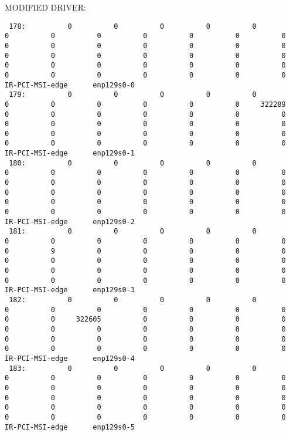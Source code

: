 MODIFIED DRIVER:
\begin{lstlisting}
 178:          0          0          0          0          0          0          0          0          0          0          0          0          0          0          0          0          0          0          0          0          0          0          0          0          0          0          0          0          0          0          0          0          0          0          0          0          0          0          0          0  IR-PCI-MSI-edge      enp129s0-0
 179:          0          0          0          0          0          0          0          0          0          0          0     322289          0          0          0          0          0          0          0          0          0          0          0          0          0          0          0          0          0          0          0          0          0          0          0          0          0          0          0          0  IR-PCI-MSI-edge      enp129s0-1
 180:          0          0          0          0          0          0          0          0          0          0          0          0          0          0          0          0          0          0          0          0          0          0          0          0          0          0          0          0          0          0          0          0          0          0          0          0          0          0          0          0  IR-PCI-MSI-edge      enp129s0-2
 181:          0          0          0          0          0          0          0          0          0          0          0          0          0          9          0          0          0          0          0          0          0          0          0          0          0          0          0          0          0          0          0          0          0          0          0          0          0          0          0          0  IR-PCI-MSI-edge      enp129s0-3
 182:          0          0          0          0          0          0          0          0          0          0          0          0          0          0     322605          0          0          0          0          0          0          0          0          0          0          0          0          0          0          0          0          0          0          0          0          0          0          0          0          0  IR-PCI-MSI-edge      enp129s0-4
 183:          0          0          0          0          0          0          0          0          0          0          0          0          0          0          0          0          0          0          0          0          0          0          0          0          0          0          0          0          0          0          0          0          0          0          0          0          0          0          0          0  IR-PCI-MSI-edge      enp129s0-5

\end{lstlisting}

